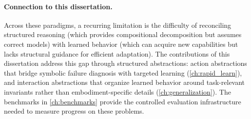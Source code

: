 \paragraph{Connection to this dissertation.}
Across these paradigms, a recurring limitation is the difficulty of reconciling structured reasoning (which provides compositional decomposition but assumes correct models) with learned behavior (which can acquire new capabilities but lacks structural guidance for efficient adaptation). The contributions of this dissertation address this gap through structured abstractions: action abstractions that bridge symbolic failure diagnosis with targeted learning (\cref{ch:rapid_learn}), and interaction abstractions that organize learned behavior around task-relevant invariants rather than embodiment-specific details (\cref{ch:generalization}). The benchmarks in \cref{ch:benchmarks} provide the controlled evaluation infrastructure needed to measure progress on these problems.